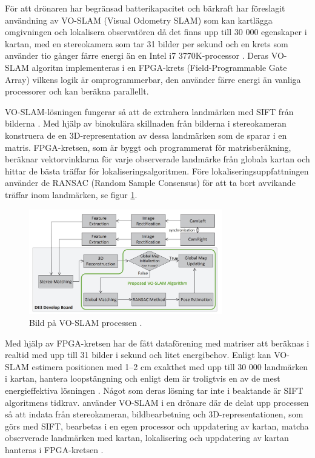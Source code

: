 För att drönaren har begränsad batterikapacitet och bärkraft har \cite{voslam} föreslagit användning av VO-SLAM (Visual Odometry SLAM) som kan kartlägga omgivningen och lokalisera observatören då det finns upp till 30 000 egenskaper i kartan, med en stereokamera som tar 31 bilder per sekund och en krets som använder tio gånger färre energi än en Intel i7 3770K-processor \citep{voslam}. Deras VO-SLAM algoritm implementeras i en FPGA-krets (Field-Programmable Gate Array) vilkens logik är omprogrammerbar, den använder färre energi än vanliga processorer och kan beräkna parallellt. 

VO-SLAM-lösningen fungerar så att de extrahera landmärken med SIFT från bilderna \citep{voslam}. Med hjälp av binokulära skillnaden från bilderna i stereokameran konstruera de en 3D-representation av dessa landmärken som de sparar i en matris. FPGA-kretsen, som är byggt och programmerat för matrisberäkning, beräknar vektorvinklarna för varje observerade landmärke från globala kartan och hittar de bästa träffar för lokaliseringsalgoritmen. Före lokaliseringsuppfattningen använder de RANSAC (Random Sample Consensus) för att ta bort avvikande träffar inom landmärken, se figur \ref{voslamprocess}. 

\begin{figure}[ht]
    \begin{center}
    \includegraphics[width=0.75\textwidth]{voslam.JPG}
    \caption{Bild på VO-SLAM processen \citep{voslam}.}
    \label{voslamprocess}
    \end{center}
\end{figure}

Med hjälp av FPGA-kretsen har de fått dataförening med matriser att beräknas i realtid med upp till 31 bilder i sekund och litet energibehov. Enligt \cite{voslam} kan VO-SLAM estimera positionen med 1–2 cm exakthet med upp till 30 000 landmärken i kartan, hantera loopstängning och enligt dem är troligtvis en av de mest energieffektiva lösningen \citep{voslam}. Något som deras lösning tar inte i beaktande är SIFT algoritmens tidkrav. \cite{voslamlatif} använder VO-SLAM i en drönare där de delat upp processen så att indata från stereokameran, bildbearbetning och 3D-representationen, som görs med SIFT, bearbetas i en egen processor och uppdatering av kartan, matcha observerade landmärken med kartan, lokalisering och uppdatering av kartan hanteras i FPGA-kretsen \citep{voslamlatif}. 

